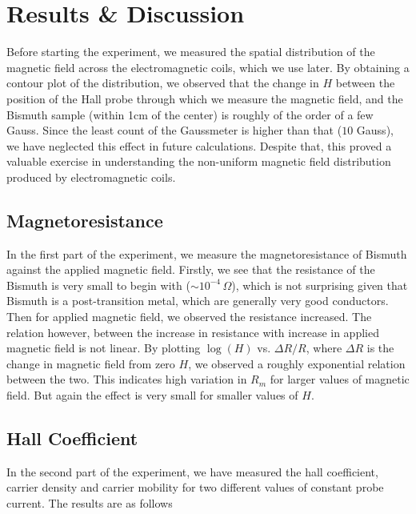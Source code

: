 \section{Results \& Discussion}

Before starting the experiment, we measured the spatial distribution of the magnetic field across the electromagnetic coils, which we use later.
By obtaining a contour plot of the distribution, we observed that the change in $H$ between the position of the Hall probe through which we measure the magnetic field, and the Bismuth sample (within 1cm of the center) is roughly of the order of a few Gauss. Since the least count of the Gaussmeter is higher than that ($10 $ Gauss), we have neglected this effect in future calculations. Despite that, this proved a valuable exercise in understanding the non-uniform magnetic field distribution produced by electromagnetic coils. \vspace{-1em}

\subsection*{Magnetoresistance}

In the first part of the experiment, we measure the magnetoresistance of Bismuth against the applied magnetic field. Firstly, we see that the resistance of the Bismuth is very small to begin with ($\sim 10^{-4}\,\Omega$), which is not surprising given that Bismuth is a post-transition metal, which are generally  very good conductors. Then for applied magnetic field, we observed the resistance increased. The relation however, between the increase in resistance with increase in applied magnetic field is not linear. By plotting $\log(H)$ vs. $\Delta R/R$, where $\Delta R$ is the change in magnetic field from zero $H$, we observed a roughly exponential relation between the two. This indicates high variation in $R_m$ for larger values of magnetic field. But again the effect is very small for smaller values of $H$. 

\subsection*{Hall Coefficient}
In the second part of the experiment, we have measured the hall coefficient, carrier density and carrier mobility for two different values of constant probe current. The results are as follows

